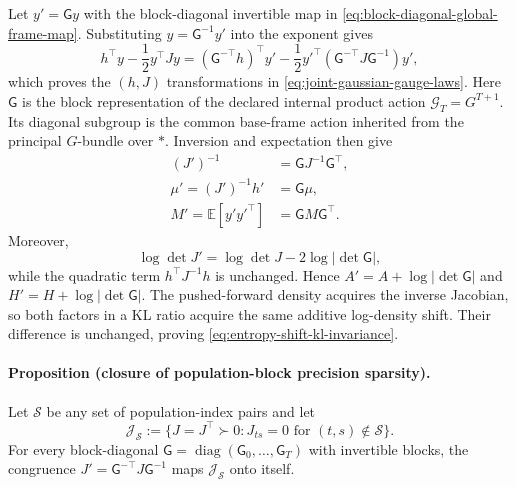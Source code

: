 Let $y'=\mathsf G y$ with the block-diagonal invertible map in \cref{eq:block-diagonal-global-frame-map}.  Substituting $y=\mathsf G^{-1}y'$ into the exponent gives
\begin{equation}
h^\top y-\frac12y^\top Jy
=(\mathsf G^{-\top}h)^\top y'
-\frac12y'^\top
(\mathsf G^{-\top}J\mathsf G^{-1})y',
\label{eq:gauge-transformed-information-exponent}
\end{equation}
which proves the $(h,J)$ transformations in \cref{eq:joint-gaussian-gauge-laws}. Here $\mathsf G$ is the block representation of the declared internal product action $\mathcal G_T=G^{T+1}$. Its diagonal subgroup is the common base-frame action inherited from the principal $G$-bundle over $\ast$. Inversion and expectation then give
\begin{equation}
\begin{aligned}
(J')^{-1}
&=\mathsf GJ^{-1}\mathsf G^\top,\\
\mu'=(J')^{-1}h'
&=\mathsf G\mu,\\
M'=\mathbb E[y'y'^\top]
&=\mathsf GM\mathsf G^\top.
\end{aligned}
\label{eq:gauge-transformed-moment-proof}
\end{equation}
Moreover,
\begin{equation}
\log\det J'
=\log\det J-2\log|\det\mathsf G|,
\label{eq:gauge-precision-logdet-shift}
\end{equation}
while the quadratic term $h^\top J^{-1}h$ is unchanged.  Hence $A'=A+\log|\det\mathsf G|$ and $H'=H+\log|\det\mathsf G|$.  The pushed-forward density acquires the inverse Jacobian, so both factors in a KL ratio acquire the same additive log-density shift.  Their difference is unchanged, proving \cref{eq:entropy-shift-kl-invariance}.

\paragraph{Proposition (closure of population-block precision sparsity).}
Let $\mathcal S$ be any set of population-index pairs and let
\begin{equation}
\mathcal J_{\mathcal S}
:=\{J=J^\top\succ0:J_{ts}=0\text{ for }(t,s)\notin\mathcal S\}.
\label{eq:token-block-sparse-precision-family}
\end{equation}
For every block-diagonal $\mathsf G=\operatorname{diag}(\mathsf G_0,\ldots,\mathsf G_T)$ with invertible blocks, the congruence $J'=\mathsf G^{-\top}J\mathsf G^{-1}$ maps $\mathcal J_{\mathcal S}$ onto itself.

